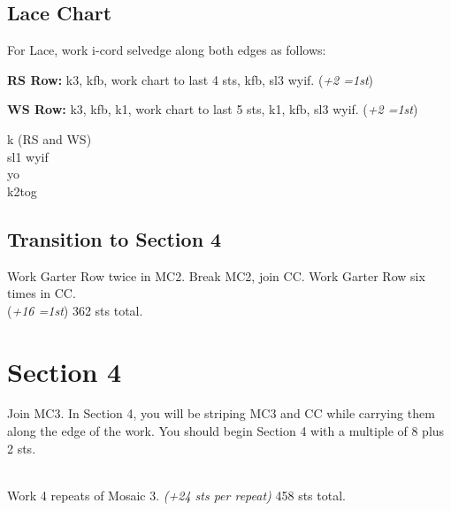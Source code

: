 \documentclass[12pt]{article}
\newcommand{\rowDir}[1]{\textbf{#1:}} %
\newcommand{\increase}[1]{(\emph{+#1 
	\ifnum#1=1{st}\else{sts}\fi})}
\begin{document}
\subsection*{Lace Chart}

For Lace, work i-cord selvedge along both edges as follows:

\hspace{2em} \rowDir{RS Row} k3, kfb, work chart to last 4 sts, kfb, sl3 wyif. \increase{2}

\hspace{2em} \rowDir{WS Row} k3, kfb, k1, work chart to last 5 sts, k1, kfb, sl3 wyif. \increase{2}

\begin{multicols}{2}

\vfill \columnbreak
\begin{addmargin}[4em]{0em} \small

\textknit{-} k (RS and WS) \\

 sl1 wyif \\

 yo \\

\textknit{>} k2tog
\end{addmargin}
\end{multicols}

\subsection*{Transition to Section 4} %

Work Garter Row twice in MC2. Break MC2, join CC. Work Garter Row six times in CC. 
\\ \increase{16} 362 sts total.

\newpage
\section*{Section 4} %

Join MC3. In Section 4, you will be striping MC3 and CC while carrying them along the edge of the work. You should begin Section 4 with a multiple of 8 plus 2 sts. 

~\\
Work 4 repeats of Mosaic 3. \emph{(+24 sts per repeat)} 458 sts total.
\end{document}
